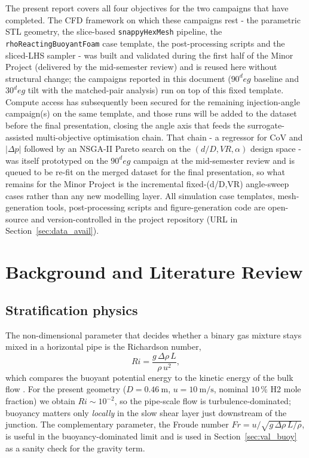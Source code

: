 \documentclass[11pt,a4paper]{article}
\def\Hi{H2}%
\def\dD{d/D}%
\def\VR{VR}%
\def\CoV{CoV}%
\def\Ri{Ri}%
\def\Frnum{Fr}%
\def\circ{ deg}%
\newcommand{\Hi}{\ensuremath{\mathrm{H_2}}}
\newcommand{\dD}{\ensuremath{d/D}}
\newcommand{\VR}{\ensuremath{\mathrm{VR}}}
\newcommand{\CoV}{\ensuremath{\mathrm{CoV}}}
\newcommand{\Ri}{\ensuremath{\mathrm{Ri}}}
\newcommand{\Frnum}{\ensuremath{\mathrm{Fr}}}
\begin{document}
The present report covers all four objectives for the two
campaigns that have completed. The CFD framework on which these
campaigns rest - the parametric STL geometry, the slice-based
\texttt{snappyHexMesh} pipeline, the \texttt{rhoReactingBuoyantFoam}
case template, the post-processing scripts and the sliced-LHS
sampler - was built and validated during the first half of the
Minor Project (delivered by the mid-semester review) and is
reused here without structural change; the campaigns reported in
this document (\(90^\circ\) baseline and \(30^\circ\) tilt with
the matched-pair analysis) run on top of this fixed template.
Compute access has subsequently been secured for the remaining
injection-angle campaign(s) on the same template, and those runs
will be added to the dataset before the final presentation,
closing the angle axis that feeds the surrogate-assisted
multi-objective optimisation chain. That chain - a regressor
for \CoV{} and \(|\Delta p|\) followed by an NSGA-II Pareto search
on the \((\dD,\VR,\alpha)\) design space - was itself prototyped
on the \(90^\circ\) campaign at the mid-semester review and is
queued to be re-fit on the merged dataset for the final
presentation, so what remains for the Minor Project is the
incremental fixed-(\dD,\VR) angle-sweep cases rather than any new
modelling layer. All simulation case templates, mesh-generation
tools, post-processing scripts and figure-generation code are
open-source and version-controlled in the project repository
(URL in Section~\ref{sec:data_avail}).

\section{Background and Literature Review}
\label{sec:lit}

\subsection{Stratification physics}
The non-dimensional parameter that decides whether a binary gas
mixture stays mixed in a horizontal pipe is the Richardson number,
\begin{equation}
\Ri = \frac{g\,\Delta\rho\,L}{\rho\,u^2},
\label{eq:Ri}
\end{equation}
which compares the buoyant potential energy to the kinetic energy of
the bulk flow \citep{su2022prediction}. For the present geometry
(\(D=\SI{0.46}{\meter}\), \(u=\SI{10}{\meter\per\second}\), nominal
\(10\,\%\) \Hi{} mole fraction) we obtain \(\Ri \sim 10^{-2}\), so
the pipe-scale flow is turbulence-dominated; buoyancy matters only
\emph{locally} in the slow shear layer just downstream of the
junction. The complementary parameter, the Froude number
\(\Frnum = u/\sqrt{g\,\Delta\rho\,L/\rho}\), is useful in the
buoyancy-dominated limit and is used in Section~\ref{sec:val_buoy}
as a sanity check for the gravity term.
\end{document}
